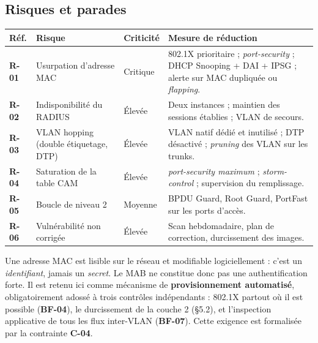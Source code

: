 \documentclass[11pt,a4paper]{article}
\newcommand{\rid}[1]{\textcolor{primary}{\textbf{\small #1}}}
\begin{document}
\subsection{Risques et parades}
\begin{table}[H]
\centering
\begin{tabularx}{\textwidth}{L{1.3cm} L{3.9cm} C{1.5cm} Y}
\toprule
{}\textbf{Réf.} & \textbf{Risque} & \textbf{Criticité} & \textbf{Mesure de réduction} \\
\midrule
\rid{R-01} & Usurpation d'adresse MAC & Critique & 802.1X prioritaire ; \textit{port-security} ; DHCP Snooping + DAI + IPSG ; alerte sur MAC dupliquée ou \textit{flapping}. \\
\rid{R-02} & Indisponibilité du RADIUS & Élevée & Deux instances ; maintien des sessions établies ; VLAN de secours. \\
\rid{R-03} & VLAN hopping (double étiquetage, DTP) & Élevée & VLAN natif dédié et inutilisé ; DTP désactivé ; \textit{pruning} des VLAN sur les trunks. \\
\rid{R-04} & Saturation de la table CAM & Élevée & \textit{port-security maximum} ; \textit{storm-control} ; supervision du remplissage. \\
\rid{R-05} & Boucle de niveau 2 & Moyenne & BPDU Guard, Root Guard, PortFast sur les ports d'accès. \\
\rid{R-06} & Vulnérabilité non corrigée & Élevée & Scan hebdomadaire, plan de correction, durcissement des images. \\
\bottomrule
\end{tabularx}
\end{table}

\begin{alertbox}
Une adresse MAC est lisible sur le réseau et modifiable logiciellement : c'est un \emph{identifiant}, jamais un \emph{secret}. Le MAB ne constitue donc pas une authentification forte. Il est retenu ici comme mécanisme de \textbf{provisionnement automatisé}, obligatoirement adossé à trois contrôles indépendants : 802.1X partout où il est possible (\rid{BF-04}), le durcissement de la couche 2 (\S5.2), et l'inspection applicative de tous les flux inter-VLAN (\rid{BF-07}). Cette exigence est formalisée par la contrainte \rid{C-04}.
\end{alertbox}
\end{document}
